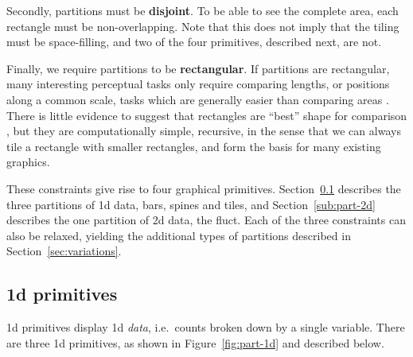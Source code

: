 \documentclass[journal]{vgtc}
\begin{document}
Secondly, partitions must be {\bf disjoint}. To be able to see the complete area, each rectangle must be non-overlapping. Note that this does not imply that the tiling must be space-filling, and two of the four primitives, described next, are not.

Finally, we require partitions to be {\bf rectangular}. If partitions are rectangular, many interesting perceptual tasks only require comparing lengths, or positions along a common scale, tasks which are generally easier than comparing areas \citep{cleveland:1984,cleveland:1986}. There is little evidence to suggest that rectangles are ``best'' shape for comparison \citep{hollands:1998,simkin:1987}, but they are computationally simple, recursive, in the sense that we can always tile a rectangle with smaller rectangles, and form the basis for many existing graphics.

These constraints give rise to four graphical primitives. Section~\ref{sub:part-1d} describes the three partitions of 1d data, bars, spines and tiles, and Section~\ref{sub:part-2d} describes the one partition of 2d data, the fluct. Each of the three constraints can also be relaxed, yielding the additional types of partitions described in Section~\ref{sec:variations}.

\subsection{1d primitives}
\label{sub:part-1d}

1d primitives display 1d \emph{data}, i.e.\ counts broken down by a single variable. There are three 1d primitives, as shown in Figure~\ref{fig:part-1d} and described below.
\end{document}
